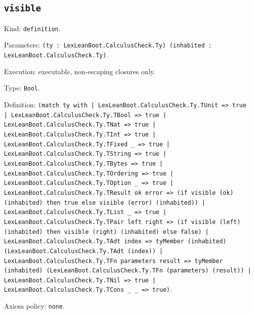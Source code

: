 \documentclass[11pt]{article}
\begin{document}
\subsection*{\texttt{visible}}
\noindent Kind: \texttt{definition}.\par
\noindent Parameters: \texttt{(ty : LexLeanBoot.CalculusCheck.Ty) (inhabited : LexLeanBoot.CalculusCheck.Ty)}.\par
\noindent Execution: executable, non-escaping closures only.\par
\noindent Type: \texttt{Bool}.\par
\noindent Definition: \texttt{(match ty with | LexLeanBoot.CalculusCheck.Ty.TUnit => true | LexLeanBoot.CalculusCheck.Ty.TBool => true | LexLeanBoot.CalculusCheck.Ty.TNat => true | LexLeanBoot.CalculusCheck.Ty.TInt => true | LexLeanBoot.CalculusCheck.Ty.TFixed \_ => true | LexLeanBoot.CalculusCheck.Ty.TString => true | LexLeanBoot.CalculusCheck.Ty.TBytes => true | LexLeanBoot.CalculusCheck.Ty.TOrdering => true | LexLeanBoot.CalculusCheck.Ty.TOption \_ => true | LexLeanBoot.CalculusCheck.Ty.TResult ok error => (if visible (ok) (inhabited) then true else visible (error) (inhabited)) | LexLeanBoot.CalculusCheck.Ty.TList \_ => true | LexLeanBoot.CalculusCheck.Ty.TPair left right => (if visible (left) (inhabited) then visible (right) (inhabited) else false) | LexLeanBoot.CalculusCheck.Ty.TAdt index => tyMember (inhabited) (LexLeanBoot.CalculusCheck.Ty.TAdt (index)) | LexLeanBoot.CalculusCheck.Ty.TFn parameters result => tyMember (inhabited) (LexLeanBoot.CalculusCheck.Ty.TFn (parameters) (result)) | LexLeanBoot.CalculusCheck.Ty.TNil => true | LexLeanBoot.CalculusCheck.Ty.TCons \_ \_ => true)}.\par
\noindent Axiom policy: \texttt{none}.\par
\end{document}
